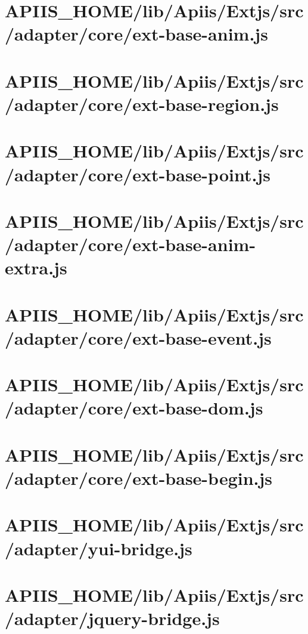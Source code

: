 \section{APIIS\_HOME/lib/Apiis/Extjs/src/adapter/core/ext-base-anim.js} 
\section{APIIS\_HOME/lib/Apiis/Extjs/src/adapter/core/ext-base-region.js} 
\section{APIIS\_HOME/lib/Apiis/Extjs/src/adapter/core/ext-base-point.js} 
\section{APIIS\_HOME/lib/Apiis/Extjs/src/adapter/core/ext-base-anim-extra.js} 
\section{APIIS\_HOME/lib/Apiis/Extjs/src/adapter/core/ext-base-event.js} 
\section{APIIS\_HOME/lib/Apiis/Extjs/src/adapter/core/ext-base-dom.js} 
\section{APIIS\_HOME/lib/Apiis/Extjs/src/adapter/core/ext-base-begin.js} 
\section{APIIS\_HOME/lib/Apiis/Extjs/src/adapter/yui-bridge.js} 
\section{APIIS\_HOME/lib/Apiis/Extjs/src/adapter/jquery-bridge.js} 
